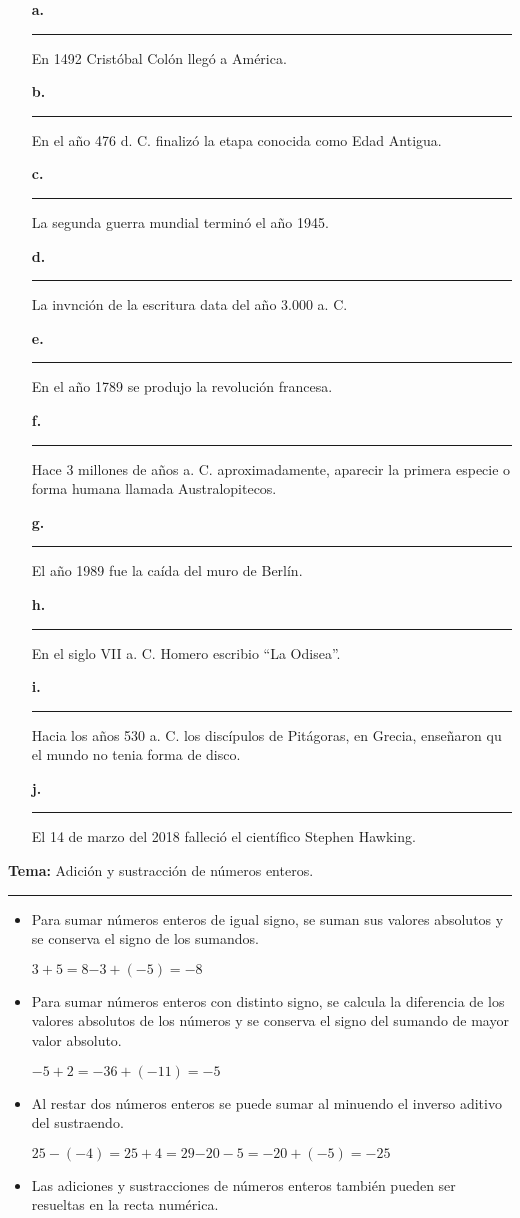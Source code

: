 \documentclass[spanish,letterpaper, 11pt, addpoints, answers]{exam}
\begin{document}
\begin{questions}
  \begin{itemize}
  \item[\textbf{a.}]\rule{1cm}{0.4pt} En 1492 Cristóbal Colón llegó a América.
  \item[\textbf{b.}]\rule{1cm}{0.4pt} En el año 476 d. C. finalizó la etapa conocida como Edad Antigua.
  \item[\textbf{c.}]\rule{1cm}{0.4pt} La segunda guerra mundial terminó el año 1945.
  \item[\textbf{d.}]\rule{1cm}{0.4pt} La invnción de la escritura data del año 3.000 a. C.
  \item[\textbf{e.}]\rule{1cm}{0.4pt} En el año 1789 se produjo la revolución francesa.
  \item[\textbf{f.}]\rule{1cm}{0.4pt} Hace 3 millones de años a. C. aproximadamente, aparecir la primera especie o forma humana llamada Australopitecos.
  \item[\textbf{g.}]\rule{1cm}{0.4pt} El año 1989 fue la caída del muro de Berlín.
  \item[\textbf{h.}]\rule{1cm}{0.4pt} En el siglo VII a. C. Homero escribio ``La Odisea''.
  \item[\textbf{i.}]\rule{1cm}{0.4pt} Hacia los años 530 a. C. los discípulos de Pitágoras, en Grecia, enseñaron qu el mundo no tenia forma de disco.
  \item[\textbf{j.}]\rule{1cm}{0.4pt} El 14 de marzo del 2018 falleció el científico Stephen Hawking.
  \end{itemize}
\newpage
  \vspace{0.1in}
  \parbox{6in}{
  \textbf{Tema:} Adición y sustracción de números enteros.}
  \vspace{0.15in}
  \hrule 
  
  \begin{itemize}
    \item Para sumar números enteros de igual signo, se suman sus valores absolutos y se conserva el signo de los sumandos.
    \begin{center}
      $3+5=8$\hspace{2cm}$-3+(-5)=-8$
    \end{center}
    \item Para sumar números enteros con distinto signo, se calcula la diferencia de los valores absolutos de los números y se conserva el signo del sumando de mayor valor absoluto.
    \begin{center}
      $-5+2=-3$\hspace{2cm}$6+(-11)=-5$
    \end{center}
    \item Al restar dos números enteros se puede sumar al minuendo el inverso aditivo del sustraendo.
    \begin{center}
      $25-(-4)=25+4=29$\hspace{2cm}$-20-5=-20+(-5)=-25$
    \end{center}
    \item Las adiciones y sustracciones de números enteros también pueden ser resueltas en la recta numérica.
    

\end{itemize}
\end{questions}
\end{document}
